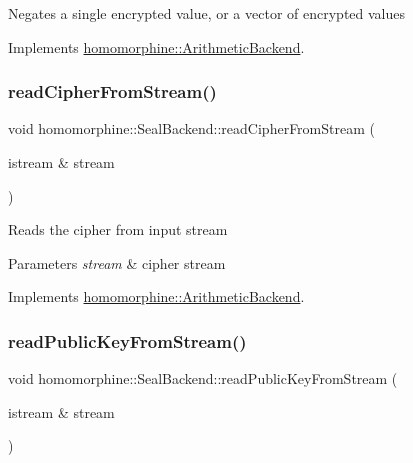 Negates a single encrypted value, or a vector of encrypted values 

Implements \mbox{\hyperlink{classhomomorphine_1_1_arithmetic_backend_ad27913060534c42b5812a1e4cf21475f}{homomorphine\+::\+Arithmetic\+Backend}}.

\mbox{\label{classhomomorphine_1_1_seal_backend_a2b6704607e71b72122d3820b750f1bee}} 
\subsubsection{\texorpdfstring{readCipherFromStream()}{readCipherFromStream()}}
{\footnotesize\ttfamily void homomorphine\+::\+Seal\+Backend\+::read\+Cipher\+From\+Stream (\begin{DoxyParamCaption}\item[{istream \&}]{stream }\end{DoxyParamCaption})\hspace{0.3cm}{\ttfamily [virtual]}}

Reads the cipher from input stream


\begin{DoxyParams}{Parameters}
{\em stream} & cipher stream \\
\hline
\end{DoxyParams}


Implements \mbox{\hyperlink{classhomomorphine_1_1_arithmetic_backend_ac8fe4568424c616b653a955b172c480b}{homomorphine\+::\+Arithmetic\+Backend}}.

\mbox{\label{classhomomorphine_1_1_seal_backend_a5bcb7f49667f2a2e095690fdec484b51}} 
\subsubsection{\texorpdfstring{readPublicKeyFromStream()}{readPublicKeyFromStream()}}
{\footnotesize\ttfamily void homomorphine\+::\+Seal\+Backend\+::read\+Public\+Key\+From\+Stream (\begin{DoxyParamCaption}\item[{istream \&}]{stream }\end{DoxyParamCaption})\hspace{0.3cm}{\ttfamily [virtual]}}

